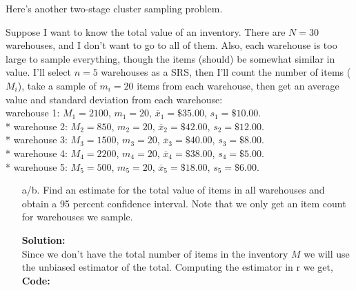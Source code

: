 \documentclass[12pt]{article}
\makeatletter
\theoremstyle{homework}
\newenvironment{exercise}[1]
{\def\@currentlabel{#1}\exercisecore}
{\endexercisecore}
\newcommand{\localhead}[1]{\par\smallskip\noindent\textbf{#1}\nobreak\\}%
\newcommand\solution{\localhead{Solution:}}
\makeatother
\begin{document}
\begin{exercise}{4} 
  Here's another two-stage cluster sampling problem.
  
  Suppose I want to know the total value of an inventory. There are $N = 30$ warehouses, 
  and I don’t want to go to all of them. Also, each warehouse is too large to sample 
  everything, though the items (should) be somewhat similar in value. I’ll select 
  $n = 5$ warehouses as a SRS, then I’ll count the number of items ($M_i$), take a 
  sample of $m_i = 20$ items from each warehouse, then get an average value and standard 
  deviation from each warehouse:\\


\noindent* warehouse 1: $M_1 = 2100$, $m_1 = 20$, $\overline{x}_1 = \$35.00$, $s_1 = \$10.00$. \\
         * warehouse 2: $M_2 = 850$, $m_2 = 20$, $\overline{x}_2 = \$42.00$, $s_2 = \$12.00$. \\
         * warehouse 3: $M_3 = 1500$, $m_3 = 20$, $\overline{x}_3 = \$40.00$, $s_3 = \$8.00$. \\
         * warehouse 4: $M_4 = 2200$, $m_4 = 20$, $\overline{x}_4 = \$38.00$, $s_4 = \$5.00$. \\
         * warehouse 5: $M_5 = 500$, $m_5 = 20$, $\overline{x}_5 = \$18.00$, $s_5 = \$6.00$.\\
  
\begin{enumerate}
  \item[a/b.]  Find an estimate for the total value of items in all warehouses and obtain a 95 percent confidence interval. 
  Note that we only get an item count for warehouses we sample.\\
  \solution Since we don't have the total number of items in the inventory $M$ we will use the unbiased estimator of the total. 
  Computing the estimator in r we get,\\
  \textbf{Code:}
  \begin{center}
     
  \end{center}

\end{enumerate}



\end{exercise}
\end{document}
